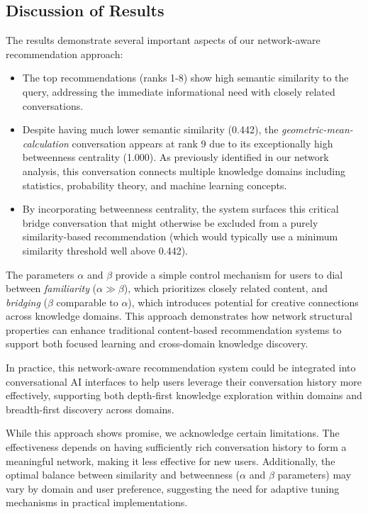 \documentclass[10pt, a4paper]{article}
\begin{document}
\subsection{Discussion of Results}

The results demonstrate several important aspects of our network-aware recommendation approach:

\begin{itemize}
    \item The top recommendations (ranks 1-8) show high semantic similarity to the query, addressing the immediate informational need with closely related conversations.
    
    \item Despite having much lower semantic similarity (0.442), the \textit{geometric-mean-calculation} conversation appears at rank 9 due to its exceptionally high betweenness centrality (1.000). As previously identified in our network analysis, this conversation connects multiple knowledge domains including statistics, probability theory, and machine learning concepts.
    
    \item By incorporating betweenness centrality, the system surfaces this critical bridge conversation that might otherwise be excluded from a purely similarity-based recommendation (which would typically use a minimum similarity threshold well above 0.442).
\end{itemize}

The parameters \(\alpha\) and \(\beta\) provide a simple control mechanism for users to dial between \emph{familiarity} (\(\alpha\gg\beta\)), which prioritizes closely related content, and \emph{bridging} (\(\beta\) comparable to \(\alpha\)), which introduces potential for creative connections across knowledge domains. This approach demonstrates how network structural properties can enhance traditional content-based recommendation systems to support both focused learning and cross-domain knowledge discovery.

In practice, this network-aware recommendation system could be integrated into conversational AI interfaces to help users leverage their conversation history more effectively, supporting both depth-first knowledge exploration within domains and breadth-first discovery across domains.

While this approach shows promise, we acknowledge certain limitations. The effectiveness depends on having sufficiently rich conversation history to form a meaningful network, making it less effective for new users. Additionally, the optimal balance between similarity and betweenness ($\alpha$ and $\beta$ parameters) may vary by domain and user preference, suggesting the need for adaptive tuning mechanisms in practical implementations.
\end{document}
